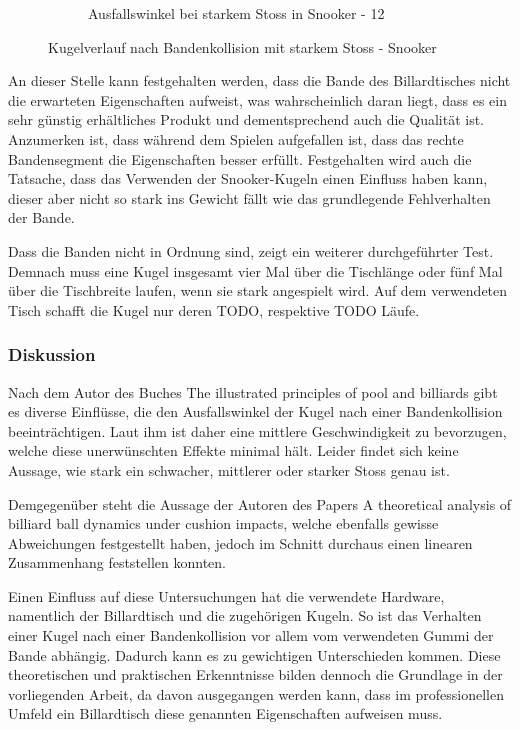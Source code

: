 \begin{figure}[h!]
\begin{subfigure}[b]{0.2\textwidth}
        \caption{Ausfallswinkel bei starkem Stoss in Snooker - 12}
        \label{fig:rebound_angle_fast_snooker_12}
    \end{subfigure}
    \caption{Kugelverlauf nach Bandenkollision mit starkem Stoss - Snooker}
    \label{fig:kugelverlauf_nach_bandenkollision_mit_starkem_stoss_snooker}
\end{figure}

\newpage
An dieser Stelle kann festgehalten werden, dass die Bande des Billardtisches nicht die erwarteten Eigenschaften
aufweist, was wahrscheinlich daran liegt, dass es ein sehr günstig erhältliches Produkt und dementsprechend auch
die Qualität ist. Anzumerken ist, dass während dem Spielen aufgefallen ist, dass das rechte Bandensegment die
Eigenschaften besser erfüllt. Festgehalten wird auch die Tatsache, dass das Verwenden der Snooker-Kugeln einen
Einfluss haben kann, dieser aber nicht so stark ins Gewicht fällt wie das grundlegende Fehlverhalten
der Bande.

Dass die Banden nicht in Ordnung sind, zeigt ein weiterer durchgeführter Test. Demnach muss eine Kugel insgesamt vier Mal über
die Tischlänge oder fünf Mal über die Tischbreite laufen, wenn sie stark angespielt wird\cite{sport64:bandengummi}.
Auf dem verwendeten Tisch schafft die Kugel nur deren TODO, respektive TODO Läufe.

\newpage
\subsubsection{Diskussion}
Nach dem Autor des Buches \glqq The illustrated principles of pool and billiards\grqq{} gibt es diverse Einflüsse,
die den Ausfallswinkel der Kugel nach einer Bandenkollision beeinträchtigen. Laut ihm ist daher eine mittlere
Geschwindigkeit zu bevorzugen, welche diese unerwünschten Effekte minimal hält\cite{book:the_ilustrated_principles_of_pool_and_billiards}.
Leider findet sich keine Aussage, wie stark ein schwacher, mittlerer oder starker Stoss genau ist.

Demgegenüber steht die Aussage der Autoren des Papers \glqq A theoretical analysis of billiard ball dynamics under cushion impacts\grqq, welche ebenfalls
gewisse Abweichungen festgestellt haben, jedoch im Schnitt durchaus einen linearen Zusammenhang feststellen konnten.

Einen Einfluss auf diese Untersuchungen hat die verwendete Hardware, namentlich der Billardtisch und die
zugehörigen Kugeln. So ist das Verhalten einer Kugel nach einer Bandenkollision vor allem vom verwendeten Gummi der
Bande abhängig. Dadurch kann es zu gewichtigen Unterschieden kommen.
Diese theoretischen und praktischen Erkenntnisse bilden dennoch die Grundlage in der vorliegenden Arbeit,
da davon ausgegangen werden kann, dass im professionellen  Umfeld ein Billardtisch diese genannten Eigenschaften aufweisen muss.

